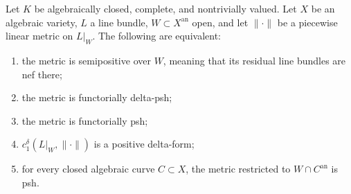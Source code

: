 \begin{theorem}\label{thm:gk-formal-positivity-comparison}
Let $K$ be algebraically closed, complete, and nontrivially valued.  Let
$X$ be an algebraic variety, $L$ a line bundle, $W\subset X^{\mathrm{an}}$
open, and let $\|\cdot\|$ be a piecewise linear metric on $L|_W$.  The
following are equivalent:
\begin{enumerate}
\item the metric is semipositive over $W$, meaning that its residual line
      bundles are nef there;
\item the metric is functorially delta-psh;
\item the metric is functorially psh;
\item $c_1^\delta(L|_W,\|\cdot\|)$ is a positive delta-form;
\item for every closed algebraic curve $C\subset X$, the metric restricted
      to $W\cap C^{\mathrm{an}}$ is psh.
\end{enumerate}
\end{theorem}
